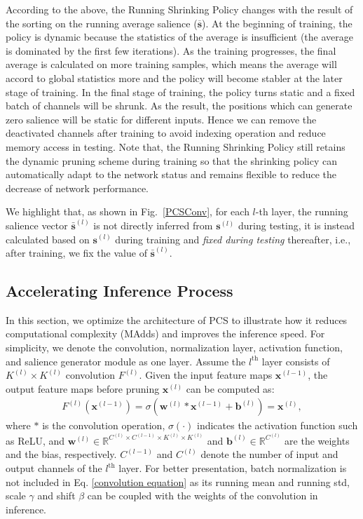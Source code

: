 \documentclass[lettersize,journal]{IEEEtran}
\begin{document}
According to the above, the Running Shrinking Policy changes with the result of the sorting on the running average salience ($\overline{\boldsymbol{s}}$). 
At the beginning of training, the policy is dynamic because the statistics of the average is insufficient (the average is dominated by the first few iterations). As the training progresses, the final average is calculated on more training samples, which means the average will accord to global statistics more and the policy will become stabler at the later stage of training. In the final stage of training, the policy turns static and a fixed batch of channels will be shrunk. 
As the result, the positions which can generate zero salience will be static for different inputs. 
Hence we can remove the deactivated channels after training to avoid indexing operation and reduce memory access in testing. Note that, the Running Shrinking Policy still retains the dynamic pruning scheme during training so that the shrinking policy can automatically adapt to the network status and remains flexible to reduce the decrease of network performance. 


We highlight that, as shown in Fig.~\ref{PCSConv}, for each $l$-th layer, the running salience vector ${\bar{\boldsymbol{s}}}^{(l)}$ is not directly inferred from ${\boldsymbol{s}}^{(l)}$ during testing, it is instead calculated based on $\boldsymbol{s}^{(l)}$ during training and \textit{fixed during testing} thereafter, i.e., after training, we fix the value of ${\bar{\boldsymbol{s}}}^{(l)}$. 


\subsection{Accelerating Inference Process}
\label{Sec: Accelerating Inference Process}
In this section, we optimize the architecture of PCS to illustrate how it reduces computational complexity (MAdds) and improves the inference speed. 
For simplicity, we denote the convolution, normalization layer, activation function, and salience generator module as one layer. Assume the $l^{\text{th}}$ layer consists of $K^{(l)}\times K^{(l)}$ convolution $F^{(l)}$. 
Given the input feature maps $\boldsymbol{x}^{(l-1)}$, the output feature maps before pruning $\boldsymbol{x}^{(l)}$ can be computed as:
\begin{align}
  \label{convolution equation}
  F^{(l)}(\boldsymbol{x}^{(l-1)})= \sigma(\boldsymbol{w}^{(l)}*\boldsymbol{x}^{(l-1)} + \boldsymbol{b}^{(l)})=\boldsymbol{x}^{(l)},
\end{align}
where $*$ is the convolution operation,  $\sigma(\cdot)$ indicates the activation function such as ReLU, and $\boldsymbol{w}^{(l)}\in \mathbb{R}^{C^{(l)}\times C^{(l-1)}\times K^{(l)}\times K^{(l)}}$ and $\boldsymbol{b}^{(l)}\in \mathbb{R}^{C^{(l)}}$ are the weights and the bias, respectively.
$C^{(l-1)}$ and $C^{(l)}$ denote the number of  input and output channels of the $l^{\text{th}}$ layer. 
For better presentation, batch normalization is not included in Eq. \eqref{convolution equation} as its running mean and running std, scale $\gamma$ and shift $\beta$ can be coupled with the weights of the convolution in inference. 
\end{document}
